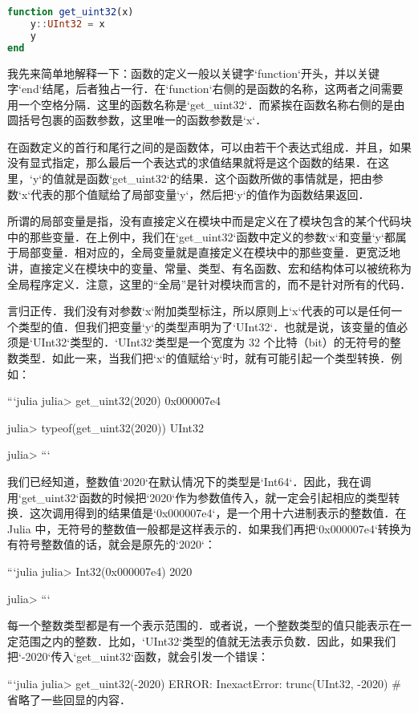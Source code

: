 \begin{lstlisting}[language=julia]
function get_uint32(x)
    y::UInt32 = x
    y
end
\end{lstlisting}

我先来简单地解释一下：函数的定义一般以关键字`function`开头，并以关键字`end`结尾，后者独占一行．在`function`右侧的是函数的名称，这两者之间需要用一个空格分隔．这里的函数名称是`get_uint32`．而紧挨在函数名称右侧的是由圆括号包裹的函数参数，这里唯一的函数参数是`x`．

在函数定义的首行和尾行之间的是函数体，可以由若干个表达式组成．并且，如果没有显式指定，那么最后一个表达式的求值结果就将是这个函数的结果．在这里，`y`的值就是函数`get_uint32`的结果．这个函数所做的事情就是，把由参数`x`代表的那个值赋给了局部变量`y`，然后把`y`的值作为函数结果返回．

所谓的局部变量是指，没有直接定义在模块中而是定义在了模块包含的某个代码块中的那些变量．在上例中，我们在`get_uint32`函数中定义的参数`x`和变量`y`都属于局部变量．相对应的，全局变量就是直接定义在模块中的那些变量．更宽泛地讲，直接定义在模块中的变量、常量、类型、有名函数、宏和结构体可以被统称为全局程序定义．注意，这里的“全局”是针对模块而言的，而不是针对所有的代码．

言归正传．我们没有对参数`x`附加类型标注，所以原则上`x`代表的可以是任何一个类型的值．但我们把变量`y`的类型声明为了`UInt32`．也就是说，该变量的值必须是`UInt32`类型的．`UInt32`类型是一个宽度为 32 个比特（bit）的无符号的整数类型．如此一来，当我们把`x`的值赋给`y`时，就有可能引起一个类型转换．例如：

```julia
julia> get_uint32(2020)
0x000007e4

julia> typeof(get_uint32(2020))
UInt32

julia> 
```

我们已经知道，整数值`2020`在默认情况下的类型是`Int64`．因此，我在调用`get_uint32`函数的时候把`2020`作为参数值传入，就一定会引起相应的类型转换．这次调用得到的结果值是`0x000007e4`，是一个用十六进制表示的整数值．在 Julia 中，无符号的整数值一般都是这样表示的．如果我们再把`0x000007e4`转换为有符号整数值的话，就会是原先的`2020`：

```julia
julia> Int32(0x000007e4)
2020

julia> 
```

每一个整数类型都是有一个表示范围的．或者说，一个整数类型的值只能表示在一定范围之内的整数．比如，`UInt32`类型的值就无法表示负数．因此，如果我们把`-2020`传入`get_uint32`函数，就会引发一个错误：

```julia
julia> get_uint32(-2020)
ERROR: InexactError: trunc(UInt32, -2020)
# 省略了一些回显的内容．

